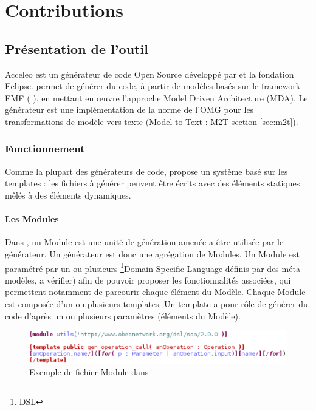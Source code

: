 \chapter{Contributions}\label{chap:tra}

\section{Présentation de l'outil \kwacceleo{}}\label{sec:acc}

Acceleo est un générateur de code Open Source développé par \kwobeo{} et la fondation Eclipse. \kwacceleo{} permet de générer du code, à partir de modèles basés sur le framework EMF (\cf{} \cite{emf}), en mettant en œuvre l'approche Model Driven Architecture (MDA). Le générateur \kwacceleo{} est une implémentation de la norme de l'OMG pour les transformations de modèle vers texte (Model to Text : M2T \cf{} section \ref{sec:m2t}).

\subsection{Fonctionnement}

Comme la plupart des générateurs de code, \kwacceleo{} propose un système basé sur les templates : les fichiers à générer peuvent être écrits avec des éléments statiques mêlés à des éléments dynamiques.

\subsubsection{Les Modules}

Dans \kwacceleo{}, un Module est une unité de génération amenée a être utilisée par le générateur. Un générateur est donc une agrégation de Modules. Un Module est paramétré par un ou plusieurs \footnote{DSL}{Domain Specific Language} définis par des méta-modèles, a vérifier) afin de pouvoir proposer les fonctionnalités associées, qui permettent notamment de parcourir chaque élément du Modèle. Chaque Module est composée d'un ou plusieurs templates. Un template a pour rôle de générer du code d'après un ou plusieurs paramètres (éléments du Modèle).

\begin{figure}[htb]
  \centering
  \includegraphics[scale=0.6]{img/screen_template.eps}
  \caption{Exemple de fichier Module dans \kwacceleo{}}
  \label{fig:acc_module}
\end{figure}

